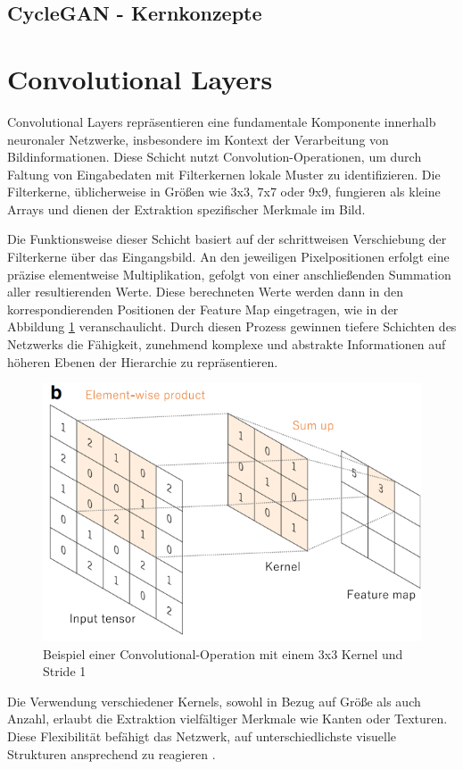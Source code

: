 \subsection{CycleGAN - Kernkonzepte}


\section{Convolutional Layers}
Convolutional Layers repräsentieren eine fundamentale Komponente innerhalb neuronaler Netzwerke, insbesondere im Kontext der Verarbeitung von Bildinformationen. Diese Schicht nutzt Convolution-Operationen, um durch Faltung von Eingabedaten mit Filterkernen lokale Muster zu identifizieren. Die Filterkerne, üblicherweise in Größen wie 3x3, 7x7 oder 9x9, fungieren als kleine Arrays und dienen der Extraktion spezifischer Merkmale im Bild.

Die Funktionsweise dieser Schicht basiert auf der schrittweisen Verschiebung der Filterkerne über das Eingangsbild. An den jeweiligen Pixelpositionen erfolgt eine präzise elementweise Multiplikation, gefolgt von einer anschließenden Summation aller resultierenden Werte. Diese berechneten Werte werden dann in den korrespondierenden Positionen der Feature Map eingetragen, wie in der Abbildung \ref{fig:convolutionalLayer} veranschaulicht. Durch diesen Prozess gewinnen tiefere Schichten des Netzwerks die Fähigkeit, zunehmend komplexe und abstrakte Informationen auf höheren Ebenen der Hierarchie zu repräsentieren.

\begin{figure}[ht]
	\centering
	\includegraphics[width=0.5\linewidth]{./images/convolutionalLayer.png}
	\caption{Beispiel einer Convolutional-Operation mit einem 3x3 Kernel und Stride 1 \cite{Yamashita.2018}}
	\label{fig:convolutionalLayer}
\end{figure}

Die Verwendung verschiedener Kernels, sowohl in Bezug auf Größe als auch Anzahl, erlaubt die Extraktion vielfältiger Merkmale wie Kanten oder Texturen. Diese Flexibilität befähigt das Netzwerk, auf unterschiedlichste visuelle Strukturen ansprechend zu reagieren \cite{Yamashita.2018}.

